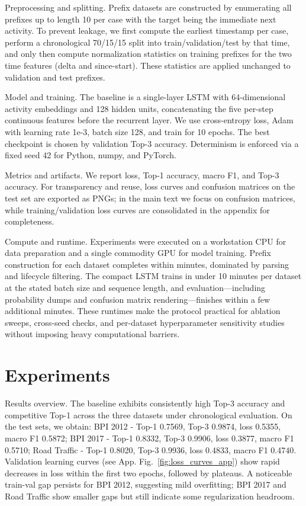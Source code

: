 \documentclass{article}
\theoremstyle{plain}
\theoremstyle{definition}
\theoremstyle{remark}
\begin{document}
	Preprocessing and splitting. Prefix datasets are constructed by enumerating all prefixes up to length 10 per case with the target being the immediate next activity. To prevent leakage, we first compute the earliest timestamp per case, perform a chronological 70/15/15 split into train/validation/test by that time, and only then compute normalization statistics on training prefixes for the two time features (delta and since-start). These statistics are applied unchanged to validation and test prefixes.
	
	Model and training. The baseline is a single-layer LSTM with 64-dimensional activity embeddings and 128 hidden units, concatenating the five per-step continuous features before the recurrent layer. We use cross-entropy loss, Adam with learning rate 1e-3, batch size 128, and train for 10 epochs. The best checkpoint is chosen by validation Top-3 accuracy. Determinism is enforced via a fixed seed 42 for Python, numpy, and PyTorch.
	
	Metrics and artifacts. We report loss, Top-1 accuracy, macro F1, and Top-3 accuracy. For transparency and reuse, loss curves and confusion matrices on the test set are exported as PNGs; in the main text we focus on confusion matrices, while training/validation loss curves are consolidated in the appendix for completeness.
	
	Compute and runtime. Experiments were executed on a workstation CPU for data preparation and a single commodity GPU for model training. Prefix construction for each dataset completes within minutes, dominated by parsing and lifecycle filtering. The compact LSTM trains in under 10 minutes per dataset at the stated batch size and sequence length, and evaluation---including probability dumps and confusion matrix rendering---finishes within a few additional minutes. These runtimes make the protocol practical for ablation sweeps, cross-seed checks, and per-dataset hyperparameter sensitivity studies without imposing heavy computational barriers.
	
	\section{Experiments}
	\label{sec:experiments}
	Results overview. The baseline exhibits consistently high Top-3 accuracy and competitive Top-1 across the three datasets under chronological evaluation. On the test sets, we obtain:
	BPI 2012 - Top-1 0.7569, Top-3 0.9874, loss 0.5355, macro F1 0.5872;
	BPI 2017 - Top-1 0.8332, Top-3 0.9906, loss 0.3877, macro F1 0.5710;
	Road Traffic - Top-1 0.8020, Top-3 0.9936, loss 0.4833, macro F1 0.4740.
	Validation learning curves (see App. Fig.~\ref{fig:loss_curves_app}) show rapid decreases in loss within the first two epochs, followed by plateaus. A noticeable train-val gap persists for BPI 2012, suggesting mild overfitting; BPI 2017 and Road Traffic show smaller gaps but still indicate some regularization headroom.
	
\end{document}
